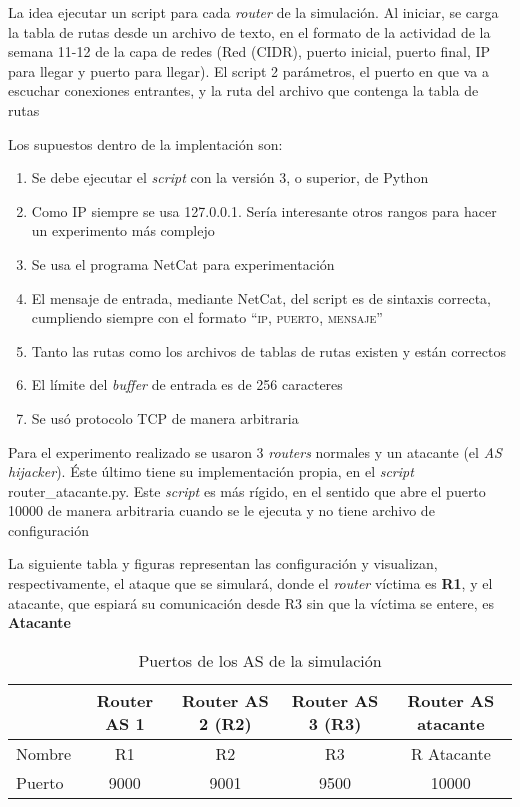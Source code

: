 \documentclass{article}
\begin{document}
La idea ejecutar un script para cada \textit{router} de la simulación. Al iniciar, se carga la tabla de rutas desde un archivo de texto, en el formato de la actividad de la semana 11-12 de la capa de redes (Red (CIDR), puerto inicial, puerto final, IP para llegar y puerto para llegar). El script 2 parámetros, el puerto en que va a escuchar conexiones entrantes, y la ruta del archivo que contenga la tabla de rutas

Los supuestos dentro de la implentación son:
\begin{enumerate}
\item Se debe ejecutar el \textit{script} con la versión 3, o superior, de Python
\item Como IP siempre se usa 127.0.0.1. Sería interesante otros rangos para hacer un experimento más complejo
\item Se usa el programa NetCat para experimentación
\item El mensaje de entrada, mediante NetCat, del script es de sintaxis correcta, cumpliendo siempre con el formato ``\textsc{ip}, \textsc{puerto}, \textsc{mensaje}''
\item Tanto las rutas como los archivos de tablas de rutas existen y están correctos
\item El límite del \textit{buffer} de entrada es de 256 caracteres
\item Se usó protocolo TCP de manera arbitraria
\end{enumerate}

Para el experimento realizado se usaron 3 \textit{routers} normales y un atacante (el \textit{AS hijacker}). Éste último tiene su implementación propia, en el \textit{script} router\_atacante.py. Este \textit{script} es más rígido, en el sentido que abre el puerto 10000 de manera arbitraria cuando se le ejecuta y no tiene archivo de configuración

La siguiente tabla y figuras representan las configuración y visualizan, respectivamente, el ataque que se simulará, donde el \textit{router} víctima es \textbf{R1}, y el atacante, que espiará su comunicación desde R3 sin que la víctima se entere, es \textbf{Atacante}

\begin{table}[H]
\centering
\caption{Puertos de los AS de la simulación}
\begin{tabular}[t]{lcccc}
\hline
&Router AS 1 &Router AS 2 (R2)&Router AS 3 (R3)&Router AS atacante\\
\hline
Nombre & R1 & R2 & R3 & R Atacante \\
Puerto & 9000 & 9001 & 9500 & 10000 \\
\hline
\end{tabular}
\end{table}
\end{document}
